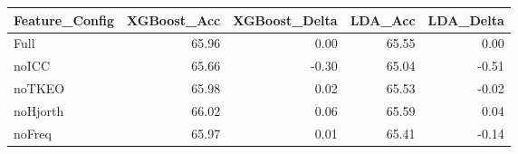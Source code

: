 \begin{tabular}{lrrrr}
\toprule
Feature_Config & XGBoost_Acc & XGBoost_Delta & LDA_Acc & LDA_Delta \\
\midrule
Full & 65.96 & 0.00 & 65.55 & 0.00 \\
noICC & 65.66 & -0.30 & 65.04 & -0.51 \\
noTKEO & 65.98 & 0.02 & 65.53 & -0.02 \\
noHjorth & 66.02 & 0.06 & 65.59 & 0.04 \\
noFreq & 65.97 & 0.01 & 65.41 & -0.14 \\
\bottomrule
\end{tabular}
